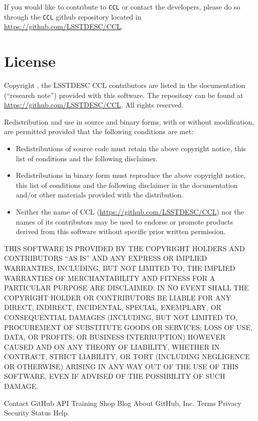 \documentclass[\docopts]{\docclass}
\begin{document}
If you would like to contribute to {\tt CCL} or contact the developers, please do so through the {\tt CCL} github repository located in \url{https://github.com/LSSTDESC/CCL}.

\section{License}
\label{sec:license}

Copyright , the LSSTDESC CCL contributors are listed in the
documentation (``research note'') provided with this software. The repository can be found at \url{https://github.com/LSSTDESC/CCL}. All rights reserved.

Redistribution and use in source and binary forms, with or without
modification, are permitted provided that the following conditions are met:

\begin{itemize}
\item Redistributions of source code must retain the above copyright notice, this
  list of conditions and the following disclaimer.
\item Redistributions in binary form must reproduce the above copyright notice,
  this list of conditions and the following disclaimer in the documentation
  and/or other materials provided with the distribution.
\item Neither the name of CCL (\url{https://github.com/LSSTDESC/CCL}) nor the names of its
  contributors may be used to endorse or promote products derived from
  this software without specific prior written permission.
\end{itemize}

THIS SOFTWARE IS PROVIDED BY THE COPYRIGHT HOLDERS AND CONTRIBUTORS ``AS IS''
AND ANY EXPRESS OR IMPLIED WARRANTIES, INCLUDING, BUT NOT LIMITED TO, THE
IMPLIED WARRANTIES OF MERCHANTABILITY AND FITNESS FOR A PARTICULAR PURPOSE ARE
DISCLAIMED. IN NO EVENT SHALL THE COPYRIGHT HOLDER OR CONTRIBUTORS BE LIABLE
FOR ANY DIRECT, INDIRECT, INCIDENTAL, SPECIAL, EXEMPLARY, OR CONSEQUENTIAL
DAMAGES (INCLUDING, BUT NOT LIMITED TO, PROCUREMENT OF SUBSTITUTE GOODS OR
SERVICES; LOSS OF USE, DATA, OR PROFITS; OR BUSINESS INTERRUPTION) HOWEVER
CAUSED AND ON ANY THEORY OF LIABILITY, WHETHER IN CONTRACT, STRICT LIABILITY,
OR TORT (INCLUDING NEGLIGENCE OR OTHERWISE) ARISING IN ANY WAY OUT OF THE USE
OF THIS SOFTWARE, EVEN IF ADVISED OF THE POSSIBILITY OF SUCH DAMAGE.

Contact GitHub API Training Shop Blog About  GitHub, Inc. Terms Privacy Security Status Help








\end{document}
